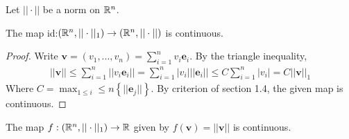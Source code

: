 \documentclass[a4paper]{article}
\begin{document}
Let $||\cdot||$ be a norm on $\mathbb{R}^n$.

\begin{lemma}
The map id:$\left(\mathbb{R}^n,||\cdot||_1\right) \to \left(\mathbb{R}^n,||\cdot||\right)$ is continuous.
\begin{proof}
Write $\mathbf{v} = \left(v_1,...,v_n\right) = \sum_{i=1}^n v_i \mathbf{e}_i$. By the triangle inequality,
\begin{equation*}
\begin{aligned}
||\mathbf{v}|| \leq \sum_{i=1}^n ||v_i\mathbf{e}_i|| = \sum_{i=1}^n |v_i| ||\mathbf{e}_i|| \leq C \sum_{i=1}^n |v_i| = C||\mathbf{v}||_1
\end{aligned}
\end{equation*}
Where $C = \max_{1\leq i} \leq n\left\{||\mathbf{e}_j||\right\}$. By criterion of section 1.4, the given map is continuous.
\end{proof}
\end{lemma}

\begin{coro}
The map $f:\left(\mathbb{R}^n, ||\cdot||_1\right) \to \mathbb{R}$ given by $f\left(\mathbf{v}\right) = ||\mathbf{v}||$ is continuous.
\end{coro}
\end{document}
